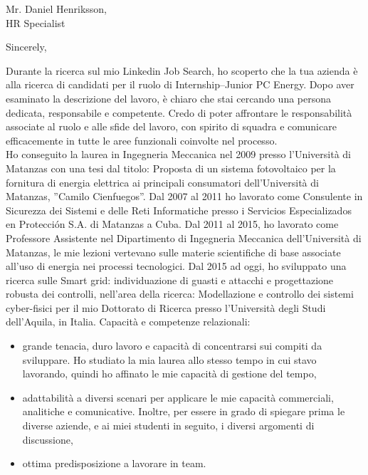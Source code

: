 \documentclass[11pt,a4paper,roman]{moderncv}
\begin{document}
	
	\date{\today}
	\opening{Mr. Daniel Henriksson,\\HR Specialist}
	\closing{Sincerely,}
	\makelettertitle
	\justify
	Durante la ricerca sul mio Linkedin Job Search, ho scoperto che la tua azienda è alla ricerca di candidati per il ruolo di Internship--Junior PC Energy. Dopo aver esaminato la descrizione del lavoro, è chiaro che stai cercando una persona dedicata, responsabile e competente. Credo di poter affrontare le responsabilità associate al ruolo e alle sfide del lavoro, con spirito di squadra e comunicare efficacemente in tutte le aree funzionali coinvolte nel processo.\\
	Ho conseguito la laurea in Ingegneria Meccanica nel 2009 presso l'Università di Matanzas con una tesi dal titolo: Proposta di un sistema fotovoltaico per la fornitura di energia elettrica ai principali consumatori dell'Università di Matanzas, ''Camilo Cienfuegos''. Dal 2007 al 2011 ho lavorato come Consulente in Sicurezza dei Sistemi e delle  Reti Informatiche presso i Servicios Especializados en Protección S.A. di Matanzas a Cuba. Dal 2011 al 2015, ho lavorato come Professore Assistente nel Dipartimento di Ingegneria Meccanica dell'Università di Matanzas, le mie lezioni vertevano sulle materie scientifiche di base associate all'uso di energia nei processi tecnologici. Dal 2015 ad oggi, ho sviluppato una ricerca sulle Smart grid: individuazione di guasti e attacchi e progettazione robusta dei controlli, nell'area della ricerca: Modellazione e controllo dei sistemi cyber-fisici per  il mio Dottorato di Ricerca presso l’Università degli Studi dell’Aquila, in Italia.
	Capacità e competenze relazionali:
	\begin{itemize}
		\item grande tenacia, duro lavoro e capacità di concentrarsi sui compiti da sviluppare. Ho studiato la mia laurea allo stesso tempo in cui stavo lavorando, quindi ho affinato le mie capacità di gestione del tempo, 
		\item adattabilità a diversi scenari per applicare le mie capacità commerciali, analitiche e comunicative. Inoltre, per essere in grado di spiegare prima le diverse aziende, e ai miei studenti in seguito, i diversi argomenti di discussione,
		\item ottima predisposizione a lavorare in team.
	\end{itemize}  
\end{document}
